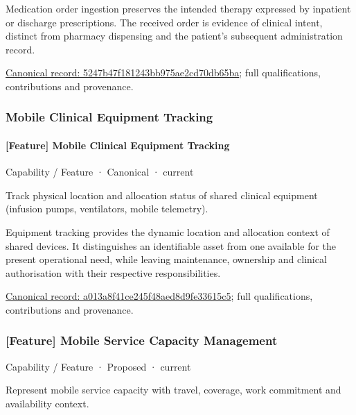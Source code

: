 Medication order ingestion preserves the intended therapy expressed by inpatient or discharge prescriptions. The received order is evidence of clinical intent, distinct from pharmacy dispensing and the patient's subsequent administration record.


{\footnotesize \href{../../../../continuum/strategy/capability/feature/5247b47f181243bb975ae2cd70db65ba.md}{Canonical record: 5247b47f181243bb975ae2cd70db65ba}; full qualifications, contributions and provenance.}\par
\subsubsection{Mobile Clinical Equipment Tracking}

\paragraph{[Feature] Mobile Clinical Equipment Tracking}

\label{element:a013a8f41ce245f48aed8d9fe33615c5}
{\small Capability / Feature · Canonical · current}\par

Track physical location and allocation status of shared clinical equipment (infusion pumps, ventilators, mobile telemetry).



Equipment tracking provides the dynamic location and allocation context of shared devices. It distinguishes an identifiable asset from one available for the present operational need, while leaving maintenance, ownership and clinical authorisation with their respective responsibilities.


{\footnotesize \href{../../../../continuum/strategy/capability/feature/a013a8f41ce245f48aed8d9fe33615c5.md}{Canonical record: a013a8f41ce245f48aed8d9fe33615c5}; full qualifications, contributions and provenance.}\par
\subsubsection{[Feature] Mobile Service Capacity Management}

\label{element:abdcb95b3725405f878f199b07779d19}
{\small Capability / Feature · Proposed · current}\par

Represent mobile service capacity with travel, coverage, work commitment and availability context.




